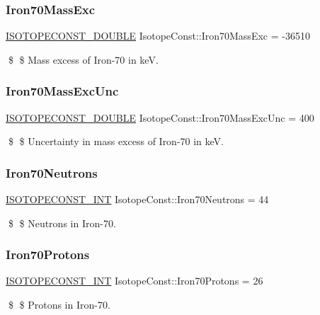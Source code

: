 \subsubsection{\texorpdfstring{Iron70\+Mass\+Exc}{Iron70MassExc}}
{\footnotesize\ttfamily \mbox{\hyperlink{group___isotope_const-_macros_ga8f45a7272ce02c0b4c65c44636ed719a}{I\+S\+O\+T\+O\+P\+E\+C\+O\+N\+S\+T\+\_\+\+D\+O\+U\+B\+LE}} Isotope\+Const\+::\+Iron70\+Mass\+Exc = -\/36510}

\$ \$ Mass excess of Iron-\/70 in keV. \mbox{\label{group___isotope_const-_iron-_fe70_ga01908f7d177548c32ec7f9317399ba1e}} 
\subsubsection{\texorpdfstring{Iron70\+Mass\+Exc\+Unc}{Iron70MassExcUnc}}
{\footnotesize\ttfamily \mbox{\hyperlink{group___isotope_const-_macros_ga8f45a7272ce02c0b4c65c44636ed719a}{I\+S\+O\+T\+O\+P\+E\+C\+O\+N\+S\+T\+\_\+\+D\+O\+U\+B\+LE}} Isotope\+Const\+::\+Iron70\+Mass\+Exc\+Unc = 400}

\$ \$ Uncertainty in mass excess of Iron-\/70 in keV. \mbox{\label{group___isotope_const-_iron-_fe70_gad5fed6e4b6dc92ebc0e7bd184d0d9c0e}} 
\subsubsection{\texorpdfstring{Iron70\+Neutrons}{Iron70Neutrons}}
{\footnotesize\ttfamily \mbox{\hyperlink{group___isotope_const-_macros_ga5f18360b3e99483a35c32d789e62621c}{I\+S\+O\+T\+O\+P\+E\+C\+O\+N\+S\+T\+\_\+\+I\+NT}} Isotope\+Const\+::\+Iron70\+Neutrons = 44}

\$ \$ Neutrons in Iron-\/70. \mbox{\label{group___isotope_const-_iron-_fe70_ga98f8f47bb98bd1560e8af88884fcea10}} 
\subsubsection{\texorpdfstring{Iron70\+Protons}{Iron70Protons}}
{\footnotesize\ttfamily \mbox{\hyperlink{group___isotope_const-_macros_ga5f18360b3e99483a35c32d789e62621c}{I\+S\+O\+T\+O\+P\+E\+C\+O\+N\+S\+T\+\_\+\+I\+NT}} Isotope\+Const\+::\+Iron70\+Protons = 26}

\$ \$ Protons in Iron-\/70. 